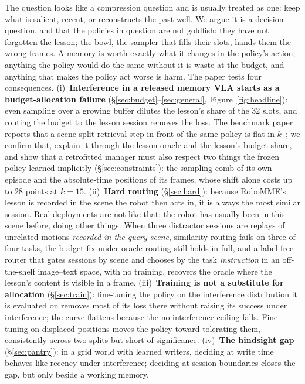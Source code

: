 \documentclass{article}
\begin{document}
The question looks like a compression question and is usually treated as one: keep what is salient, recent, or reconstructs the past well. We argue it is a decision question, and that the policies in question are not goldfish: they have not forgotten the lesson; the bowl, the sampler that fills their slots, hands them the wrong frames. A memory is worth exactly what it changes in the policy's action; anything the policy would do the same without it is waste at the budget, and anything that makes the policy act worse is harm. The paper tests four consequences. (i)~\textbf{Interference in a released memory VLA starts as a budget-allocation failure} (\S\ref{sec:budget}--\ref{sec:general}, Figure~\ref{fig:headline}): even sampling over a growing buffer dilutes the lesson's share of the 32 slots, and routing the budget to the lesson session removes the loss. The benchmark paper reports that a scene-split retrieval step in front of the same policy is flat in $k$~\cite{robomme_interference}; we confirm that, explain it through the lesson oracle and the lesson's budget share, and show that a retrofitted manager must also respect two things the frozen policy learned implicitly (\S\ref{sec:constraints}): the sampling comb of its own episode and the absolute-time positions of its frames, whose shift alone costs up to 28 points at $k{=}15$. (ii)~\textbf{Hard routing} (\S\ref{sec:hard}): because RoboMME's lesson is recorded in the scene the robot then acts in, it is always the most similar session. Real deployments are not like that: the robot has usually been in this scene before, doing other things. When three distractor sessions are replays of unrelated motions \emph{recorded in the query scene}, similarity routing fails on three of four tasks, the budget fix under oracle routing still holds in full, and a label-free router that gates sessions by scene and chooses by the task \emph{instruction} in an off-the-shelf image--text space, with no training, recovers the oracle where the lesson's content is visible in a frame. (iii)~\textbf{Training is not a substitute for allocation} (\S\ref{sec:train}): fine-tuning the policy on the interference distribution it is evaluated on removes most of its loss there without raising its success under interference; the curve flattens because the no-interference ceiling falls. Fine-tuning on displaced positions moves the policy toward tolerating them, consistently across two splits but short of significance. (iv)~\textbf{The hindsight gap} (\S\ref{sec:pantry}): in a grid world with learned writers, deciding at write time behaves like recency under interference; deciding at session boundaries closes the gap, but only beside a working memory.
\end{document}
